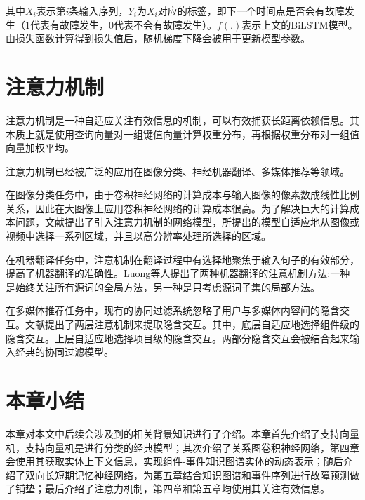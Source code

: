 其中$X_{i}$表示第$i$条输入序列，$Y_{i}$为$X_{i}$对应的标签，即下一个时间点是否会有故障发生（1代表有故障发生，0代表不会有故障发生）。$f\left(.\right)$表示上文的BiLSTM模型。由损失函数计算得到损失值后，随机梯度下降会被用于更新模型参数。

\section{注意力机制}
注意力机制是一种自适应关注有效信息的机制，可以有效捕获长距离依赖信息\cite{mnih2014recurrent}。其本质上就是使用查询向量对一组键值向量计算权重分布，再根据权重分布对一组值向量加权平均。

注意力机制已经被广泛的应用在图像分类\cite{mnih2014recurrent}、神经机器翻译\cite{DBLP:conf/emnlp/LuongPM15}、多媒体推荐\cite{chen2017attentive}等领域。

在图像分类任务中，由于卷积神经网络的计算成本与输入图像的像素数成线性比例关系，因此在大图像上应用卷积神经网络的计算成本很高。为了解决巨大的计算成本问题，文献\parencite{mnih2014recurrent}提出了引入注意力机制的网络模型，所提出的模型自适应地从图像或视频中选择一系列区域，并且以高分辨率处理所选择的区域。

在机器翻译任务中，注意机制在翻译过程中有选择地聚焦于输入句子的有效部分，提高了机器翻译的准确性。Luong等人提出了两种机器翻译的注意机制方法:一种是始终关注所有源词的全局方法，另一种是只考虑源词子集的局部方法\cite{DBLP:conf/emnlp/LuongPM15}。

在多媒体推荐任务中，现有的协同过滤系统忽略了用户与多媒体内容间的隐含交互。文献\parencite{chen2017attentive}提出了两层注意机制来提取隐含交互。其中，底层自适应地选择组件级的隐含交互。上层自适应地选择项目级的隐含交互。两部分隐含交互会被结合起来输入经典的协同过滤模型。

\section{本章小结}
本章对本文中后续会涉及到的相关背景知识进行了介绍。本章首先介绍了支持向量机，支持向量机是进行分类的经典模型；其次介绍了关系图卷积神经网络，第四章会使用其获取实体上下文信息，实现组件-事件知识图谱实体的动态表示；随后介绍了双向长短期记忆神经网络，为第五章结合知识图谱和事件序列进行故障预测做了铺垫；最后介绍了注意力机制，第四章和第五章均使用其关注有效信息。